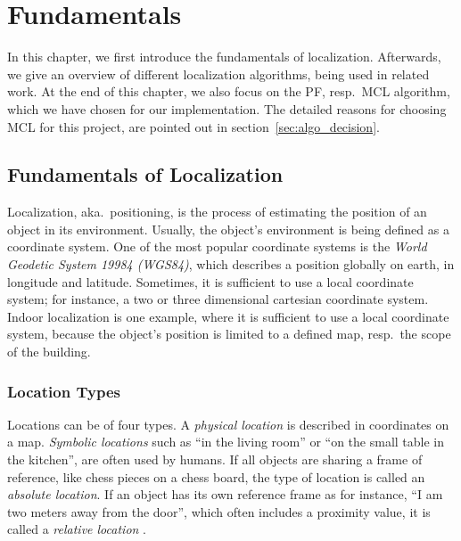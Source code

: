 \chapter{Fundamentals}\label{chap:fundamentals}

In this chapter, we first introduce the fundamentals of localization. Afterwards, we give an overview of different localization algorithms, being used in related work. At the end of this chapter, we also focus on the \acl{PF}, resp.\ \acl{MCL} algorithm, which we have chosen for our implementation. The detailed reasons for choosing \acs{MCL} for this project, are pointed out in section~\ref{sec:algo_decision}.

\section{Fundamentals of Localization}\label{sec:fund_loc}

Localization, aka.\ positioning, is the process of estimating the position of an object in its environment. Usually, the object's environment is being defined as a coordinate system. One of the most popular coordinate systems is the \emph{World Geodetic System 19984 (WGS84)}, which describes a position globally on earth, in longitude and latitude. Sometimes, it is sufficient to use a local coordinate system; for instance, a two or three dimensional cartesian coordinate system. Indoor localization is one example, where it is sufficient to use a local coordinate system, because the object's position is limited to a defined map, resp.\ the scope of the building.

\subsection{Location Types}
Locations can be of four types. A \emph{physical location} is described in coordinates on a map. \emph{Symbolic locations} such as ``in the living room'' or ``on the small table in the kitchen'', are often used by humans. If all objects are sharing a frame of reference, like chess pieces on a chess board, the type of location is called an \emph{absolute location}. If an object has its own reference frame as for instance, ``I am two meters away from the door'', which often includes a proximity value, it is called a \emph{relative location} \citep{IEEE:survey_wireless_indoor_pos}.

